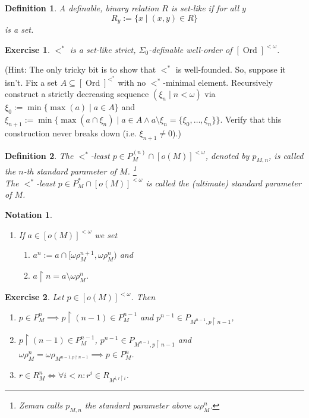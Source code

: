 \documentclass[12pt,a4paper]{article}
\theoremstyle{nicestyle}
\newtheorem{exercise}{Exercise}[subsection]
\newtheorem{definition}{Definition}[subsection]
\newtheorem{notation}{Notation}[subsection]
\DeclareMathOperator{\ord}{Ord}
\begin{document}
  \begin{definition}
    A definable, binary relation $R$ is \emph{set-like} if for all $y$
    \[
      R_{y} := \{ x \mid (x,y) \in R \} 
    \]
    is a set.
  \end{definition}

  \begin{exercise}
    $<^{*}$ is a set-like strict, $\Sigma_{0}$-definable well-order of
    $[\ord]^{< \omega}$.
  \end{exercise}

  (Hint: The only tricky bit is to show that $<^{*}$ is
  well-founded. So, suppose it isn't. Fix a set
  $A \subseteq [\ord]^{<^{*}}$ with no $<^{*}$-minimal
  element. Recursively construct a strictly decreasing sequence
  $(\xi_{n} \mid n < \omega)$ via
  $\xi_{0} := \min \{ \max(a) \mid a \in A \}$ and
  $\xi_{n+1} := \min \{ \max(a \cap \xi_{n}) \mid a \in A \wedge a
  \setminus \xi_{n} = \{ \xi_{0}, \ldots, \xi_{n} \}\}$. Verify that
  this construction never breaks down (i.e. $\xi_{n+1} \neq 0$).)

  \begin{definition}
    The $<^{*}$-least $p \in P^{(n)}_{M} \cap [o(M)]^{< \omega}$,
    denoted by $p_{M,n}$, is called the \emph{$n$-th standard
      parameter of
      $M$}. \footnote{Zeman calls $p_{M,n}$ the standard parameter above $\omega \rho^{n}_{M}$.} \\
    The $<^{*}$-least $p \in P^{*}_{M} \cap [o(M)]^{<\omega}$ is
    called the \emph{(ultimate) standard parameter of $M$}.
  \end{definition}

    \begin{notation}
    \begin{enumerate}
    \item If $a \in [o(M)]^{< \omega}$ we set
      \begin{enumerate}
      \item $a^{n} := a \cap [ \omega\rho^{n+1}_{M}, \omega\rho^{n}_{M})$ and
      \item $a \restriction n = a \setminus \omega\rho^{n}_{M}$.
      \end{enumerate}
    \end{enumerate}
  \end{notation}
  
  \begin{exercise} \label{exercise: manipulation of standard parameters}
    Let $p \in [o(M)]^{<\omega}$. Then
    \begin{enumerate}
    \item
      $p \in P^{n}_{M} \implies p \restriction (n-1) \in P^{n-1}_{M}$
      and $p^{n-1} \in P_{M^{n-1}, p \restriction n-1}$,
    \item $p \restriction (n-1) \in P^{n-1}_{M}$,
      $p^{n-1} \in P_{M^{n-1}, p \restriction n-1}$ and
      $\omega\rho^{n}_{M} = \omega\rho_{M^{n-1, p \restriction n -1}}
      \implies p \in P^{n}_{M}$.
    \item
      $r \in R^{n}_{M} \iff \forall i < n \colon r^{i} \in R_{M^{i, r
          \restriction i}}$.
    \end{enumerate}

  \end{exercise}
\end{document}
